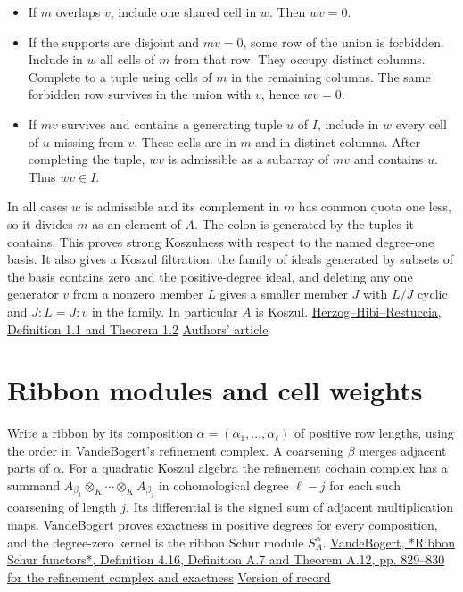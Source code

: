\documentclass[11pt]{article}
\begin{document}
\begin{itemize}
\item If $m$ overlaps $v$, include one shared cell in $w$. Then $wv=0$.
\item If the supports are disjoint and $mv=0$, some row of the union is forbidden. Include in $w$ all cells of $m$ from that row. They occupy distinct columns. Complete to a tuple using cells of $m$ in the remaining columns. The same forbidden row survives in the union with $v$, hence $wv=0$.
\item If $mv$ survives and contains a generating tuple $u$ of $I$, include in $w$ every cell of $u$ missing from $v$. These cells are in $m$ and in distinct columns. After completing the tuple, $wv$ is admissible as a subarray of $mv$ and contains $u$. Thus $wv\in I$.
\end{itemize}

In all cases $w$ is admissible and its complement in $m$ has common quota one less, so it divides $m$ as an element of $A$. The colon is generated by the tuples it contains. This proves strong Koszulness with respect to the named degree-one basis. It also gives a Koszul filtration: the family of ideals generated by subsets of the basis contains zero and the positive-degree ideal, and deleting any one generator $v$ from a nonzero member $L$ gives a smaller member $J$ with $L/J$ cyclic and $J:L=J:v$ in the family. In particular $A$ is Koszul. \href{https://doi.org/10.7146/math.scand.a-14287}{Herzog--Hibi--Restuccia, Definition 1.1 and Theorem 1.2} \enspace \href{https://www.mscand.dk/article/download/14287/12284}{Authors' article}

\section{Ribbon modules and cell weights}

Write a ribbon by its composition $\alpha=(\alpha_1,\ldots,\alpha_\ell)$ of positive row lengths, using the order in VandeBogert's refinement complex. A coarsening $\beta$ merges adjacent parts of $\alpha$. For a quadratic Koszul algebra the refinement cochain complex has a summand $A_{\beta_1}\otimes_K\cdots\otimes_K A_{\beta_j}$ in cohomological degree $\ell-j$ for each such coarsening of length $j$. Its differential is the signed sum of adjacent multiplication maps. VandeBogert proves exactness in positive degrees for every composition, and the degree-zero kernel is the ribbon Schur module $S_A^\alpha$. \href{https://msp.org/ant/2025/19-4/ant-v19-n4-p05-p.pdf}{VandeBogert, *Ribbon Schur functors*, Definition 4.16, Definition A.7 and Theorem A.12, pp. 829--830 for the refinement complex and exactness} \enspace \href{https://doi.org/10.2140/ant.2025.19.771}{Version of record}
\end{document}
